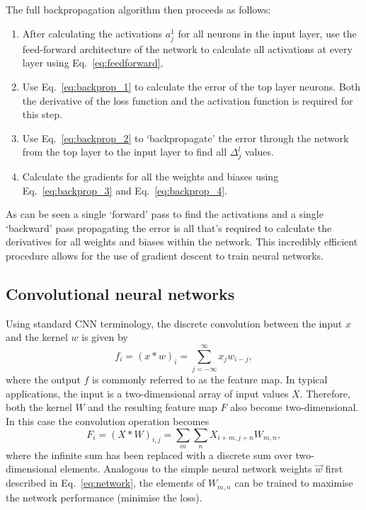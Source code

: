 The full backpropagation algorithm then proceeds as follows:
\begin{enumerate}
    \item After calculating the activations $a^{1}_{j}$ for all neurons in the input layer, use
          the feed-forward architecture of the network to calculate all activations at every layer
          using Eq.~\ref{eq:feedforward}.
    \item Use Eq.~\ref{eq:backprop_1} to calculate the error of the top layer neurons. Both the
          derivative of the loss function and the activation function is required for this step.
    \item Use Eq.~\ref{eq:backprop_2} to `backpropagate' the error through the network from the
          top layer to the input layer to find all $\Delta^{l}_{j}$ values.
    \item Calculate the gradients for all the weights and biases using Eq.~\ref{eq:backprop_3} and
          Eq.~\ref{eq:backprop_4}.
\end{enumerate}
As can be seen a single `forward' pass to find the activations and a single `backward' pass
propagating the error is all that's required to calculate the derivatives for all weights and
biases within the network. This incredibly efficient procedure allows for the use of gradient
descent to train neural networks.

\subsection{Convolutional neural networks} %
\label{sec:cvn_theory_conv} %

Using standard CNN terminology, the discrete convolution between the input $x$ and the kernel $w$
is given by
\begin{equation}
    f_{i}=(x*w)_{i}=\sum^{\infty}_{j=-\infty}x_{j}w_{i-j},
\end{equation}
where the output $f$ is commonly referred to as the feature map. In typical applications, the
input is a two-dimensional array of input values $X$. Therefore, both the kernel $W$ and the
resulting feature map $F$ also become two-dimensional. In this case the convolution operation
becomes
\begin{equation}
    F_{i}=(X*W)_{i,j}=\sum_{m}\sum_{n}X_{i+m,j+n}W_{m,n},
    \label{eq:conv}
\end{equation}
where the infinite sum has been replaced with a discrete sum over two-dimensional elements.
Analogous to the simple neural network weights $\vec{w}$ first described in Eq.~\ref{eq:network},
the elements of $W_{m,n}$ can be trained to maximise the network performance (minimise the loss).

